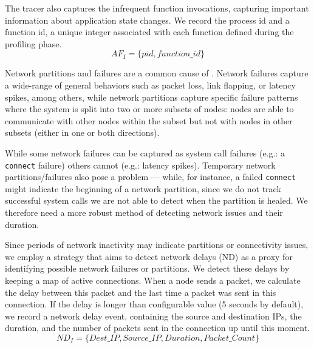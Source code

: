 \label{userfunc}
The tracer also captures the infrequent function invocations, capturing important information about application state changes.
We record the process id and a function id, a unique integer associated with each function defined during the profiling phase.
\[ AF_I = \{pid, function\_id\}  \]



\label{networktracing}
Network partitions and failures are a common cause of \efibshort.
Network failures capture a wide-range of general behaviors such as packet loss, link flapping, or latency spikes, among others, while network partitions capture specific failure patterns where the system is split into two or more subsets of nodes: nodes are able to communicate with other nodes within the subset but not with nodes in other subsets (either in one or both directions).

While some network failures can be captured as system call failures (e.g.: a \texttt{connect} failure) others cannot (e.g.: latency spikes).
Temporary network partitions/failures also pose a problem --- while, for instance, a failed \texttt{connect} might indicate the beginning of a network partition, since we do not track successful system calls we are not able to detect when the partition is healed.
We therefore need a more robust method of detecting network issues and their duration.

Since periods of network inactivity may indicate partitions or connectivity issues, we employ a strategy that aims to detect network delays (ND) as a proxy for identifying possible network failures or partitions.
We detect these delays by keeping a map of active connections.
When a node sends a packet, we calculate the delay between this packet and the last time a packet was sent in this connection.
If the delay is longer than configurable value (5 seconds by default), we record a network delay event, containing the source and destination IPs, the duration, and the number of packets sent in the connection up until this moment.
\[ND_I = \{Dest\_IP , Source\_IP , Duration, Packet\_Count\}  \]


